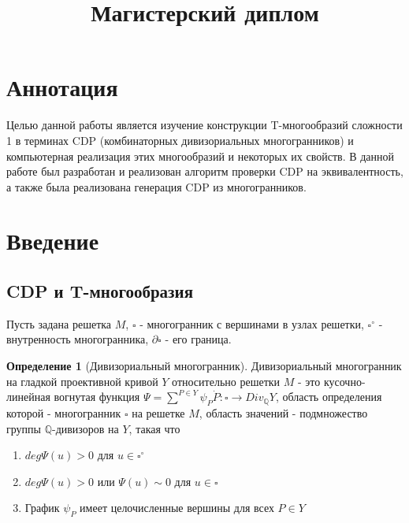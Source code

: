 \documentclass[fontsize=14pt]{scrartcl}
\title{Магистерский диплом}
\theoremstyle{definition}
\newtheorem{definition}{Определение}[section]
\begin{document}
\maketitle

\section{Аннотация}
Целью данной работы является изучение конструкции T-многообразий сложности 1 в терминах CDP (комбинаторных дивизориальных многогранников) и компьютерная реализация этих многообразий и некоторых их свойств. В данной работе был разработан и реализован алгоритм проверки CDP на эквивалентность, а также была реализована генерация CDP из многогранников.


\clearpage

\tableofcontents

\clearpage

\section{Введение}



\subsection{CDP и T-многообразия}

Пусть задана решетка $M$, $\square$ - многогранник с вершинами в узлах решетки, $\square^{\circ}$ - внутренность многогранника, $\partial\square$ - его граница.
\begin{definition}[Дивизориальный многогранник]
Дивизориальный многогранник на гладкой проективной кривой $Y$ относительно решетки $M$ - это кусочно-линейная вогнутая функция $\Psi = \sum^{P \in Y}\psi_P \dot P: \square \rightarrow Div_{\mathds{Q}}Y$, область определения которой - многогранник $\square$ на решетке $M$, область значений - подмножество группы $\mathds{Q}$-дивизоров на $Y$, такая что
\begin{enumerate}
	\item $deg\Psi(u) > 0$ для $u \in \square^{\circ}$
	\item $deg\Psi(u) > 0$ или $\Psi(u) \sim 0$ для $u \in \square$
	\item График $\psi_P$ имеет целочисленные вершины для всех $P \in Y$
\end{enumerate}
\end{definition}
\end{document}
